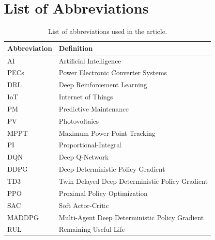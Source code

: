\section*{List of Abbreviations}
\begin{table}[h]
\renewcommand{\arraystretch}{1.2}
\centering
\begin{tabular}{ll}
\hline
\textbf{Abbreviation} & \textbf{Definition} \\
\hline
AI   & Artificial Intelligence \\
PECs & Power Electronic Converter Systems \\
DRL  & Deep Reinforcement Learning \\
IoT  & Internet of Things \\
PM   & Predictive Maintenance \\
PV   & Photovoltaics \\
MPPT & Maximum Power Point Tracking \\
PI    & Proportional-Integral \\
DQN   & Deep Q-Network \\
DDPG  & Deep Deterministic Policy Gradient \\
TD3   & Twin Delayed Deep Deterministic Policy Gradient \\
PPO   & Proximal Policy Optimization \\
SAC   & Soft Actor-Critic \\
MADDPG & Multi-Agent Deep Deterministic Policy Gradient \\
RUL   & Remaining Useful Life \\
\hline
\end{tabular}
\caption{List of abbreviations used in the article.}
\label{tab:abbreviations}
\end{table}